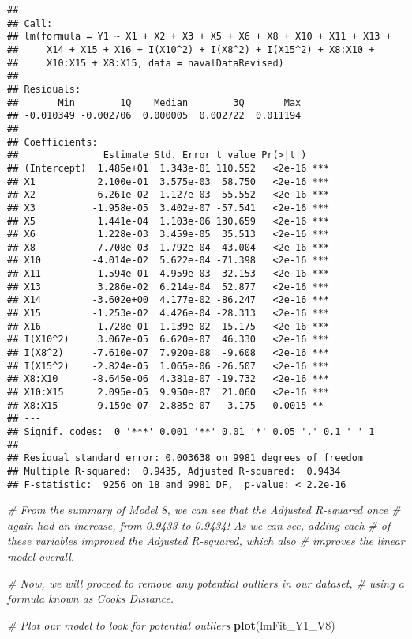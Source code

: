 \documentclass[
]{article}
\newenvironment{Shaded}{\begin{snugshade}}{\end{snugshade}}
\newcommand{\CommentTok}[1]{\textcolor[rgb]{0.56,0.35,0.01}{\textit{#1}}}
\newcommand{\KeywordTok}[1]{\textcolor[rgb]{0.13,0.29,0.53}{\textbf{#1}}}
\newcommand{\NormalTok}[1]{#1}
\begin{document}
\begin{verbatim}
## 
## Call:
## lm(formula = Y1 ~ X1 + X2 + X3 + X5 + X6 + X8 + X10 + X11 + X13 + 
##     X14 + X15 + X16 + I(X10^2) + I(X8^2) + I(X15^2) + X8:X10 + 
##     X10:X15 + X8:X15, data = navalDataRevised)
## 
## Residuals:
##       Min        1Q    Median        3Q       Max 
## -0.010349 -0.002706  0.000005  0.002722  0.011194 
## 
## Coefficients:
##               Estimate Std. Error t value Pr(>|t|)    
## (Intercept)  1.485e+01  1.343e-01 110.552   <2e-16 ***
## X1           2.100e-01  3.575e-03  58.750   <2e-16 ***
## X2          -6.261e-02  1.127e-03 -55.552   <2e-16 ***
## X3          -1.958e-05  3.402e-07 -57.541   <2e-16 ***
## X5           1.441e-04  1.103e-06 130.659   <2e-16 ***
## X6           1.228e-03  3.459e-05  35.513   <2e-16 ***
## X8           7.708e-03  1.792e-04  43.004   <2e-16 ***
## X10         -4.014e-02  5.622e-04 -71.398   <2e-16 ***
## X11          1.594e-01  4.959e-03  32.153   <2e-16 ***
## X13          3.286e-02  6.214e-04  52.877   <2e-16 ***
## X14         -3.602e+00  4.177e-02 -86.247   <2e-16 ***
## X15         -1.253e-02  4.426e-04 -28.313   <2e-16 ***
## X16         -1.728e-01  1.139e-02 -15.175   <2e-16 ***
## I(X10^2)     3.067e-05  6.620e-07  46.330   <2e-16 ***
## I(X8^2)     -7.610e-07  7.920e-08  -9.608   <2e-16 ***
## I(X15^2)    -2.824e-05  1.065e-06 -26.507   <2e-16 ***
## X8:X10      -8.645e-06  4.381e-07 -19.732   <2e-16 ***
## X10:X15      2.095e-05  9.950e-07  21.060   <2e-16 ***
## X8:X15       9.159e-07  2.885e-07   3.175   0.0015 ** 
## ---
## Signif. codes:  0 '***' 0.001 '**' 0.01 '*' 0.05 '.' 0.1 ' ' 1
## 
## Residual standard error: 0.003638 on 9981 degrees of freedom
## Multiple R-squared:  0.9435, Adjusted R-squared:  0.9434 
## F-statistic:  9256 on 18 and 9981 DF,  p-value: < 2.2e-16
\end{verbatim}

\begin{Shaded}
\begin{Highlighting}[]
\CommentTok{# From the summary of Model 8, we can see that the Adjusted R-squared once}
\CommentTok{# again had an increase, from 0.9433 to 0.9434! As we can see, adding each}
\CommentTok{# of these variables improved the Adjusted R-squared, which also }
\CommentTok{# improves the linear model overall.}

\CommentTok{# Now, we will proceed to remove any potential outliers in our dataset,}
\CommentTok{# using a formula known as Cooks Distance.}

\CommentTok{# Plot our model to look for potential outliers}
\KeywordTok{plot}\NormalTok{(lmFit_Y1_V8)}
\end{Highlighting}
\end{Shaded}
\end{document}
